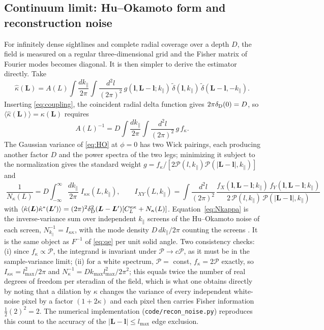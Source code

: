 \documentclass[11pt,a4paper]{article}
\newcommand{\dt}{\tilde\delta}
\newcommand{\vl}{\bm{l}}
\newcommand{\vL}{\bm{L}}
\newcommand{\kpar}{k_\parallel}
\newcommand{\PP}{\mathcal{P}}
\newcommand{\dD}{\delta_{\rm D}}
\begin{document}
\subsection{Continuum limit: Hu--Okamoto form and reconstruction noise}
\label{sec:continuum}

For infinitely dense sightlines and complete radial coverage over a depth $D$, the field is measured on a regular three-dimensional grid and the Fisher matrix of Fourier modes becomes diagonal. It is then simpler to derive the estimator directly. Take
\begin{equation}
\hat\kappa(\vL)=A(L)\int\frac{d\kpar}{2\pi}\int\frac{d^2l}{(2\pi)^2}\,g(\vl,\vL-\vl;\kpar)\,\dt(\vl,\kpar)\,\dt(\vL-\vl,-\kpar).
\label{eq:HO}
\end{equation}
Inserting \eqref{eq:coupling}, the coincident radial delta function gives $2\pi\dD(0)=D$, so $\langle\hat\kappa(\vL)\rangle=\kappa(\vL)$ requires
\begin{equation}
A(L)^{-1}=D\int\frac{d\kpar}{2\pi}\int\frac{d^2l}{(2\pi)^2}\,g\,f_\kappa .
\end{equation}
The Gaussian variance of \eqref{eq:HO} at $\phi=0$ has two Wick pairings, each producing another factor $D$ and the power spectra of the two legs; minimizing it subject to the normalization gives the standard weight $g=f_\kappa/[2\PP(l,\kpar)\PP(|\vL-\vl|,\kpar)]$ and
\begin{equation}
\boxed{\;
\frac{1}{N_\kappa(L)}=D\int_{-\infty}^{\infty}\frac{d\kpar}{2\pi}\;I_{\kappa\kappa}(L,\kpar),\qquad
I_{XY}(L,\kpar)=\int\frac{d^2l}{(2\pi)^2}\,\frac{f_X(\vl,\vL-\vl;\kpar)\,f_Y(\vl,\vL-\vl;\kpar)}{2\,\PP(l,\kpar)\,\PP(|\vL-\vl|,\kpar)}\;}
\label{eq:Nkappa}
\end{equation}
with $\langle\hat\kappa(\vL)\hat\kappa^*(\vL')\rangle=(2\pi)^2\dD^2(\vL-\vL')[C_L^{\kappa\kappa}+N_\kappa(L)]$. Equation~\eqref{eq:Nkappa} is the inverse-variance sum over independent $\kpar$ screens of the Hu--Okamoto noise of each screen, $N_{\kpar}^{-1}=I_{\kappa\kappa}$, with the mode density $D\,d\kpar/2\pi$ counting the screens \citep{astro-ph/0511547}. It is the same object as $F^{-1}$ of \eqref{eq:qe} per unit solid angle. Two consistency checks: (i) since $f_\kappa\propto\PP$, the integrand is invariant under $\PP\to c\PP$, as it must be in the sample-variance limit; (ii) for a white spectrum, $\PP=$ const, $f_\kappa=2\PP$ exactly, so $I_{\kappa\kappa}=l_{\max}^2/2\pi$ and $N_\kappa^{-1}=Dk_{\max}l_{\max}^2/2\pi^2$; this equals twice the number of real degrees of freedom per steradian of the field, which is what one obtains directly by noting that a dilation by $\kappa$ changes the variance of every independent white-noise pixel by a factor $(1+2\kappa)$ and each pixel then carries Fisher information $\frac12(2)^2=2$. The numerical implementation (\texttt{code/recon\_noise.py}) reproduces this count to the accuracy of the $|\vL-\vl|\le l_{\max}$ edge exclusion.
\end{document}
